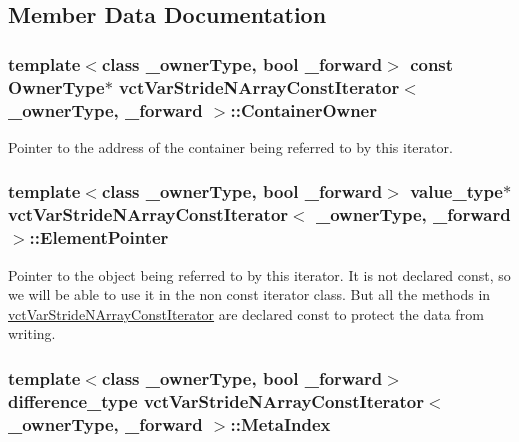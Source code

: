 \subsection{Member Data Documentation}
\hypertarget{classvct_var_stride_n_array_const_iterator_a86106a192cd073058a176e51564e86d0}{
\subsubsection[{Container\-Owner}]{\setlength{\rightskip}{0pt plus 5cm}template$<$class \-\_\-owner\-Type, bool \-\_\-forward$>$ const {\bf Owner\-Type}$\ast$ {\bf vct\-Var\-Stride\-N\-Array\-Const\-Iterator}$<$ \-\_\-owner\-Type, \-\_\-forward $>$\-::Container\-Owner\hspace{0.3cm}{\ttfamily [protected]}}}\label{classvct_var_stride_n_array_const_iterator_a86106a192cd073058a176e51564e86d0}
Pointer to the address of the container being referred to by this iterator. \hypertarget{classvct_var_stride_n_array_const_iterator_ac19e4e3a7c753b4893fd939d5d4077b1}{
\subsubsection[{Element\-Pointer}]{\setlength{\rightskip}{0pt plus 5cm}template$<$class \-\_\-owner\-Type, bool \-\_\-forward$>$ value\-\_\-type$\ast$ {\bf vct\-Var\-Stride\-N\-Array\-Const\-Iterator}$<$ \-\_\-owner\-Type, \-\_\-forward $>$\-::Element\-Pointer\hspace{0.3cm}{\ttfamily [protected]}}}\label{classvct_var_stride_n_array_const_iterator_ac19e4e3a7c753b4893fd939d5d4077b1}
Pointer to the object being referred to by this iterator. It is not declared const, so we will be able to use it in the non const iterator class. But all the methods in \hyperlink{classvct_var_stride_n_array_const_iterator}{vct\-Var\-Stride\-N\-Array\-Const\-Iterator} are declared const to protect the data from writing. \hypertarget{classvct_var_stride_n_array_const_iterator_a6f62ef67435fdd9f972f2f29cd0a011b}{
\subsubsection[{Meta\-Index}]{\setlength{\rightskip}{0pt plus 5cm}template$<$class \-\_\-owner\-Type, bool \-\_\-forward$>$ difference\-\_\-type {\bf vct\-Var\-Stride\-N\-Array\-Const\-Iterator}$<$ \-\_\-owner\-Type, \-\_\-forward $>$\-::Meta\-Index\hspace{0.3cm}{\ttfamily [protected]}}}\label{classvct_var_stride_n_array_const_iterator_a6f62ef67435fdd9f972f2f29cd0a011b}
